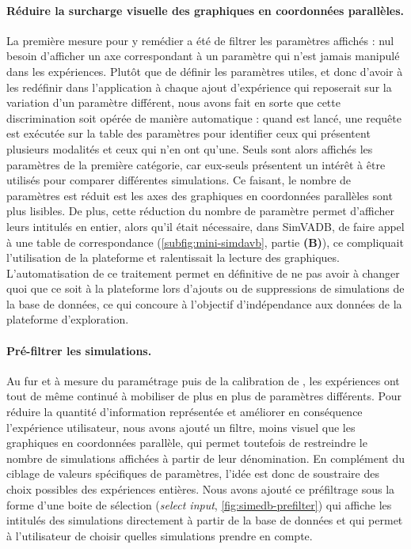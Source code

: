 \paragraph{Réduire la surcharge visuelle des graphiques en coordonnées parallèles.}
La première mesure pour y remédier a été de filtrer les paramètres affichés : nul besoin d'afficher un axe correspondant à un paramètre qui n'est jamais manipulé dans les expériences.
Plutôt que de définir les paramètres \og utiles\fg{}, et donc d'avoir à les redéfinir dans l'application à chaque ajout d'expérience qui reposerait sur la variation d'un paramètre différent, nous avons fait en sorte que cette discrimination soit opérée de manière automatique :
quand \simedb{} est lancé, une requête est exécutée sur la table des paramètres pour identifier ceux qui présentent plusieurs modalités et ceux qui n'en ont qu'une.
Seuls sont alors affichés les paramètres de la première catégorie, car eux-seuls présentent un intérêt à être utilisés pour comparer différentes simulations.
Ce faisant, le nombre de paramètres est réduit est les axes des graphiques en coordonnées parallèles sont plus lisibles.
De plus, cette réduction du nombre de paramètre permet d'afficher leurs intitulés en entier, alors qu'il était nécessaire, dans SimVADB, de faire appel à une table de correspondance (\cref{subfig:mini-simdavb}, partie \textbf{(B)}), ce compliquait l'utilisation de la plateforme et ralentissait la lecture des graphiques.
L'automatisation de ce traitement permet en définitive de ne pas avoir à changer quoi que ce soit à la plateforme lors d'ajouts ou de suppressions de simulations de la base de données, ce qui concoure à l'objectif d'indépendance aux données de la plateforme d'exploration.

\paragraph{Pré-filtrer les simulations.}
Au fur et à mesure du paramétrage puis de la calibration de \simfeodal{}, les expériences ont tout de même continué à mobiliser de plus en plus de paramètres différents.
Pour réduire la quantité d'information représentée et améliorer en conséquence \og l'expérience utilisateur\fg{}, nous avons ajouté un filtre, moins visuel que les graphiques en coordonnées parallèle, qui permet toutefois de restreindre le nombre de simulations affichées à partir de leur dénomination.
En complément du ciblage de valeurs spécifiques de paramètres, l'idée est donc de soustraire des choix possibles des expériences entières.
Nous avons ajouté ce préfiltrage sous la forme d'une \og boite de sélection (\textit{select input}, \cref{fig:simedb-prefilter}) qui affiche les intitulés des simulations directement à partir de la base de données et qui permet à l'utilisateur de choisir quelles simulations prendre en compte.
\clearpage


